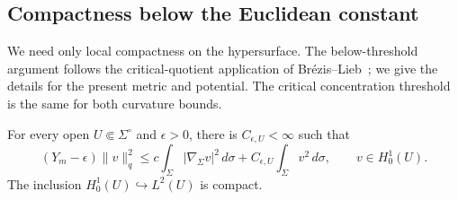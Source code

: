 \subsection{Compactness below the Euclidean constant}

We need only local compactness on the hypersurface. The below-threshold
argument follows the critical-quotient application of
Br\'ezis--Lieb~\cite[Section~4(B)]{BrezisLieb1983}; we give the details
for the present metric and potential. The critical concentration
threshold is the same for both curvature bounds.

\begin{lemma}
\label{lem:local-sobolev-threshold}
For every open $U\Subset\Sigma^\circ$ and $\epsilon>0$, there is
$C_{\epsilon,U}<\infty$ such that
\begin{equation}
\label{eq:local-sobolev-threshold}
 (Y_m-\epsilon)\|v\|_q^2
 \le c\int_\Sigma|\nabla_\Sigma v|^2\,d\sigma
       +C_{\epsilon,U}\int_\Sigma v^2\,d\sigma,
 \qquad v\in H^1_0(U).
\end{equation}
The inclusion $H^1_0(U)\hookrightarrow L^2(U)$ is compact.
\end{lemma}

